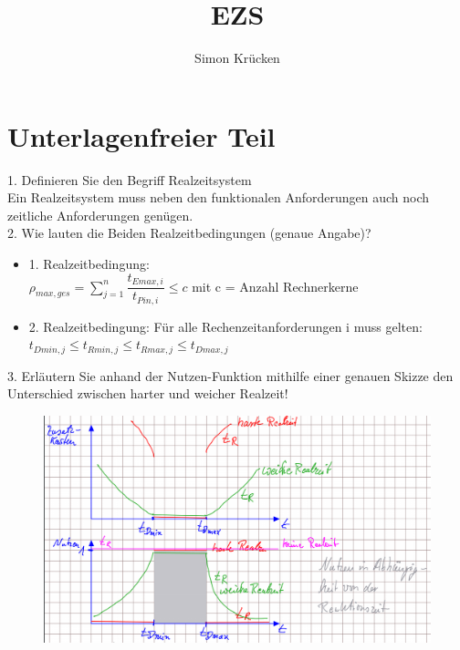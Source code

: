 \documentclass[12pt,a4paper,oneside,ngerman]{article}
\title{EZS}
\author{Simon Krücken}
\begin{document}
    
\begin{titlepage}
\end{titlepage}
\tableofcontents

\section{Unterlagenfreier Teil}

1. Definieren Sie den Begriff Realzeitsystem\\
Ein Realzeitsystem muss neben den funktionalen Anforderungen auch noch zeitliche Anforderungen genügen.\\

2. Wie lauten die Beiden Realzeitbedingungen (genaue Angabe)?\\

\begin{itemize}
	\item 1. Realzeitbedingung:\\ \(\rho_{max,ges} = \displaystyle\sum_{j=1}^n \dfrac{t_{Emax,i}}{t_{Pin,i}} \leq c\) mit c = Anzahl Rechnerkerne
	\item 2. Realzeitbedingung: Für alle Rechenzeitanforderungen i muss gelten:\\ \( t_{Dmin,j} \leq t_{Rmin,j} \leq t_{Rmax,j} \leq t_{Dmax,j} \)
\end{itemize}

3. Erläutern Sie anhand der Nutzen-Funktion mithilfe einer genauen Skizze den Unterschied zwischen harter und weicher Realzeit!\\
\begin{figure}[H]
	\centering
	\includegraphics[scale=0.3]{umlet/harte_weiche_realzeit.png}
\end{figure}
\end{document}
